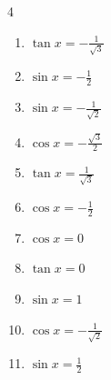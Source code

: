 \begin{multicols}{4}
\begin{enumerate}
  \item $\displaystyle \tan{x}  = -\frac{1}{\sqrt{3}}$


\columnbreak %

  \item $\displaystyle \sin{x}  = -\frac{1}{2}$


  \item $\displaystyle \sin{x}  = -\frac{1}{\sqrt{2}}$


  \item $\displaystyle \cos{x}  = -\frac{\sqrt{3}}{2}$


  \item $\displaystyle \tan{x}  = \frac{1}{\sqrt{3}}$


  \item $\displaystyle \cos{x}  = -\frac{1}{2}$


  \item $\displaystyle \cos{x}  = 0$


  \item $\displaystyle \tan{x}  = 0$


  \item $\displaystyle \sin{x}  = 1$


  \item $\displaystyle \cos{x}  = -\frac{1}{\sqrt{2}}$


  \item $\displaystyle \sin{x}  = \frac{1}{2}$



\end{enumerate}
\end{multicols}
